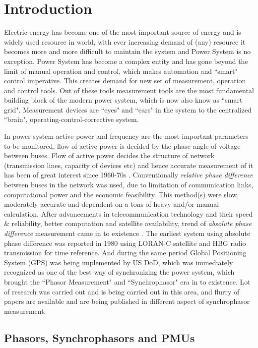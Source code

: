 \chapter{Introduction}
\setcounter{page}{1}

Electric energy has become one of the most important source of energy and is widely used resource in world, with ever increasing demand of (any) resource it becomes more and more difficult to maintain the system and Power System is no exception. Power System has become a complex entity and has gone beyond the limit of manual operation and control, which makes automation and ``smart" control imperative. This creates demand for new set of measurement, operation and control tools. Out of these tools measurement tools are the most fundamental building block of the modern power system, which is now also know as ``smart grid". Measurement devices are ``eyes" and ``ears" in the system to the centralized ``brain", operating-control-corrective system.  

In power system active power and frequency are the most important parameters to be monitored, flow of active power is decided by the phase angle of voltage between buses. Flow of active power decides the structure of network (transmission lines, capacity of devices etc) and hence accurate measurement of it has been of great interest since 1960-70s \cite{agphadkebook}. Conventionally \textit{relative phase difference} between buses in the network was used, due to limitation of communication links, computational power and the economic feasibility. This method(s) were slow, moderately accurate and dependent on a tons of heavy and/or manual calculation. 
After advancements in telecommunication technology and their speed \& reliability, better computation and satellite availability, trend of \textit{absolute phase difference} measurement came in to existence \cite{PMUhist}. The earliest system using absolute phase difference was reported in 1980 using LORAN-C satellite and HBG radio transmission for time reference. And during the same period Global Positioning System (GPS) was being implemented by US DoD, which was immediately recognized as one of the best way of synchronizing the power system, which brought the ``Phasor Measurement" and ``Synchrophasor" era in to existence. Lot of research was carried out and is being carried out in this area, and flurry of papers are available and are being published in different aspect of synchrophasor measurement. 
\section{Phasors, Synchrophasors and PMUs}

